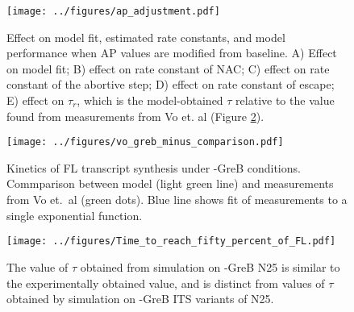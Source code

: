 \begin{figure}
    \begin{center}
      \texttt{[image: ../figures/ap\_adjustment.pdf]}
    \end{center}
    \caption{Effect on model fit, estimated rate constants, and model
      performance when AP values are modified from baseline. A) Effect on
      model fit; B) effect on rate constant of NAC; C) effect on rate constant of
      the abortive step; D) effect on rate constant of escape; E) effect on
      $\tau_r$, which is the model-obtained $\tau$ relative to the value found from
      measurements from Vo et. al \cite{vo_vitro_2003-1} (Figure
      \ref{fig:vo_comparison}).}
\label{fig:ap_adjustment}
\end{figure}


\begin{figure}
    \begin{center}
        \texttt{[image: ../figures/vo\_greb\_minus\_comparison.pdf]}
    \end{center}
    \caption{Kinetics of FL transcript synthesis under -GreB conditions.
      Commparison between model (light green line) and measurements from Vo
      et.\ al \cite{vo_vitro_2003-1} (green dots). Blue line shows fit of
      measurements to a single exponential function.}
\label{fig:vo_comparison}
\end{figure}


\begin{figure}
    \begin{center}
      \texttt{[image: ../figures/Time\_to\_reach\_fifty\_percent\_of\_FL.pdf]}
    \end{center}
    \caption{The value of $\tau$ obtained from simulation on -GreB N25 is
      similar to the experimentally obtained value, and is distinct from
      values of $\tau$ obtained by simulation on -GreB ITS variants of N25.}
\label{fig:its_variant_fl_comparison}
\end{figure}



